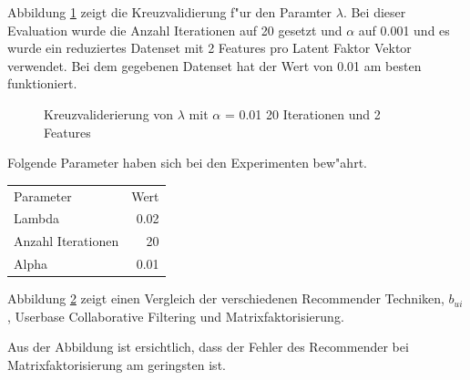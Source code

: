 \documentclass[a4paper, 12pt]{article}
\begin{document}
Abbildung \ref{fig:lambda} zeigt die Kreuzvalidierung f"ur den Paramter $\lambda$. Bei dieser Evaluation wurde die Anzahl Iterationen auf 20 gesetzt und $\alpha$ auf 0.001 und es wurde ein reduziertes Datenset mit 2 Features pro Latent Faktor Vektor verwendet.
Bei dem gegebenen Datenset hat der Wert von 0.01 am besten funktioniert.
\begin{figure}
  \centering
{}
\label{fig:lambda}
\caption{Kreuzvaliderierung von $\lambda$ mit $\alpha$ = 0.01 20 Iterationen und 2 Features}
\end{figure}

Folgende Parameter haben sich bei den Experimenten bew"ahrt.

\begin{center}
\begin{tabular}{lr}
 Parameter           &  Wert  \\
 Lambda              &  0.02  \\
 Anzahl Iterationen  &    20  \\
 Alpha               &  0.01  \\
\end{tabular}
\end{center}


Abbildung \ref{fig:compare} zeigt einen Vergleich der verschiedenen Recommender Techniken, $b_{ui}$, Userbase Collaborative Filtering und Matrixfaktorisierung.

\begin{figure}
\centering
\label{fig:compare}
\caption{}
\end{figure}

Aus der Abbildung ist ersichtlich, dass der Fehler des Recommender bei Matrixfaktorisierung am geringsten ist.
\end{document}
